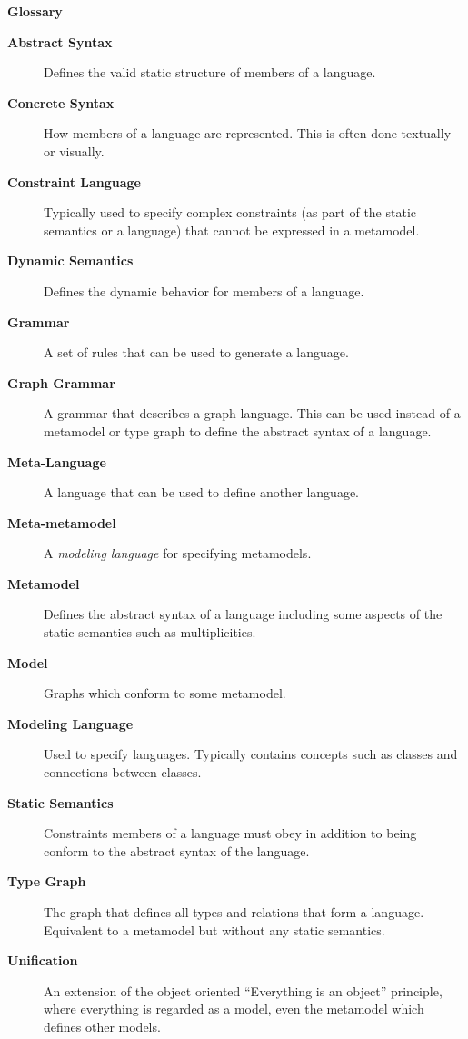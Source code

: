 \newpage
{}
{}

\vspace{1cm}
{\Huge \bf Glossary}
\vspace{1cm}


\begin{description}

\item[\bf Abstract Syntax] 
Defines the valid static structure of members of a language. 

\item[\bf Concrete Syntax]
How members of a language are represented. This is often done textually or visually.

\item[\bf Constraint Language] 
Typically used to specify complex constraints (as part of the static semantics or a language) that cannot be expressed in a metamodel.

\item[\bf Dynamic Semantics] 
Defines the dynamic behavior for members of a language.

\item[\bf Grammar] 
A set of rules that can be used to generate a language. 

\item[\bf Graph Grammar] 
A grammar that describes a graph language. This can be used instead of a metamodel or type graph to define the abstract syntax of a language.

\item[\bf Meta-Language] 
A language that can be used to define another language.

\item[\bf Meta-metamodel] 
A \emph{modeling language} for specifying metamodels.

\item[\bf Metamodel] 
Defines the abstract syntax of a language including some aspects of the static semantics such as multiplicities. 

\item[\bf Model] 
Graphs which conform to some metamodel.

\item[\bf Modeling Language] 
Used to specify languages. Typically contains concepts such as classes and connections between classes.

\item[\bf Static Semantics] 
Constraints members of a language must obey in addition to being conform to the abstract syntax of the language.

\item[\bf Type Graph] 
The graph that defines all types and relations that form a language. Equivalent to a metamodel but without any static semantics.

\item[\bf Unification]  
An extension of the object oriented ``Everything is an object'' principle, where everything is regarded as a model, even the metamodel which defines other
models.

\end{description}
